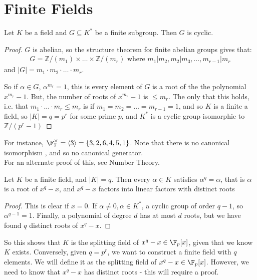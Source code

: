 \documentclass[a4paper, 10pt, twocolumn]{amsart}
\begin{document}
\section{Finite Fields}
\begin{proposition}
Let $K$ be a field and $G\subseteq K^\ast$ be a finite subgroup. Then $G$ is cyclic.
\end{proposition}
\begin{proof}
$G$ is abelian, so the structure theorem for finite abelian groups gives that:
\begin{align*}
G = \mathbb{Z}/(m_1) \times \ldots \times \mathbb{Z}/(m_r) \text{ where } m_1|m_2, m_2|m_3, \ldots, m_{r-1}|m_r
\end{align*}
and $|G|=m_1\cdot m_2 \cdot\ldots\cdot m_r$.

So if $\alpha \in G$, $\alpha^{m_r} = 1$, this is every element of $G$ is a root of the the polynomial $x^{m_r} - 1$. But, the number of roots of $x^{m_r} -1$ is $\leq m_r$. The only that this holds, i.e. that $m_1\cdot\ldots\cdot m_r\leq m_r$ is if $m_1 = m_2 = \ldots = m_{r-1} = 1$, and so $K$ is a finite a field, so $|K| = q = p^r$ for some prime $p$, and $K^\ast$ is a cyclic group isomorphic to $\mathbb{Z}/(p^r-1)$
\end{proof}
For instance, $\F_7^\times = \langle 3\rangle = \{3,2,6,4,5,1\}$.  Note that there is no canonical isomorphism , and so no canonical generator.\\
For an alternate proof of this, see Number Theory.

\begin{lemma}
Let $K$ be a finite field, and $|K|=q$. Then every $\alpha\in K$ satisfies $\alpha^q = \alpha$, that is $\alpha$ is a root of $x^q - x$, and $x^q-x$ factors into linear factors with distinct roots
\end{lemma}
\begin{proof}
This is clear if $x=0$. If $\alpha\neq 0, \alpha\in K^\ast$, a cyclic group of order $q-1$, so $\alpha^{q-1} = 1$. Finally, a polynomial of degree $d$ has at most $d$ roots, but we have found $q$ distinct roots of $x^q-x$.
\end{proof}
So this shows that $K$ is the splitting field of $x^q-x \in \F_p[x]$, given that we know $K$ exists. Conversely, given $q = p^r$, we want to construct a finite field with $q$ elements. We will define it as the splitting field of $x^q-x\in \F_p[x]$. However, we need to know that $x^q-x$ has distinct roots - this will require a proof.
\end{document}
